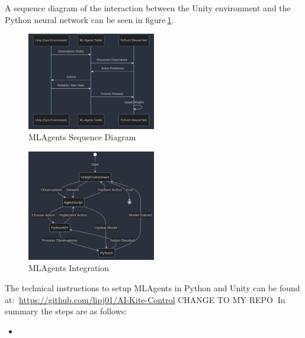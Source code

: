 A sequence diagram of the interaction between the Unity environment and the Python neural network can be seen in figure$~$\ref{MLAgents_Seq_Diagram}.

\begin{figure}[h]
    \centering
    \includegraphics[width=0.5\textwidth]{Images/MLAgents_Seq_Diagram.png}
    \caption{MLAgents Sequence Diagram}\label{MLAgents_Seq_Diagram}
\end{figure}




\begin{figure}[h]
    \centering
    \includegraphics[width=0.5\textwidth]{Images/unity_mlagents.png}
    \caption{MLAgents Integration}\label{MLAgents_Integration}
\end{figure}



The technical instructions to setup MLAgents in Python and Unity can be found at:
\newline$~$\url{https://github.com/lipj01/AI-Kite-Control} CHANGE TO MY REPO
\newline$~$In summary the steps are as follows:
\begin{itemize}
    \item 
\end{itemize}

